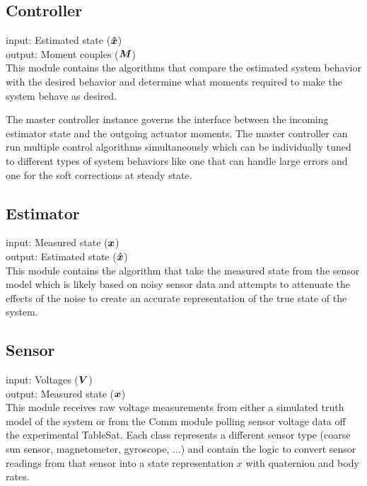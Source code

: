 \subsection{Controller}
\label{subsec:Controller}

input: Estimated state ($\boldsymbol{\hat{x}}$)\\
output: Moment couples ($\boldsymbol{M}$)\\

This module contains the algorithms that compare the estimated system behavior with the desired behavior and determine what moments required to make the system behave as desired.

The master controller instance governs the interface between the incoming estimator state and the outgoing actuator moments. The master controller can run multiple control algorithms simultaneously which can be individually tuned to different types of system behaviors like one that can handle large errors and one for the soft corrections at steady state.


\subsection{Estimator}
\label{subsec:Estimator}

input: Measured state ($\boldsymbol{x}$)\\
output: Estimated state ($\boldsymbol{\hat{x}}$)\\

This module contains the algorithm that take the measured state from the sensor model which is likely based on noisy sensor data and attempts to attenuate the effects of the noise to create an accurate representation of the true state of the system.

\subsection{Sensor}
\label{subsec:Sensor}

input: Voltages ($\boldsymbol{V}$)\\
output: Measured state ($\boldsymbol{x}$)\\

This module receives raw voltage measurements from either a simulated truth model of the system or from the Comm module polling sensor voltage data off the experimental TableSat.  Each class represents a different sensor type (coarse sun sensor, magnetometer, gyroscope, ...) and contain the logic to convert sensor readings from that sensor into a state representation $x$ with quaternion and body rates.



